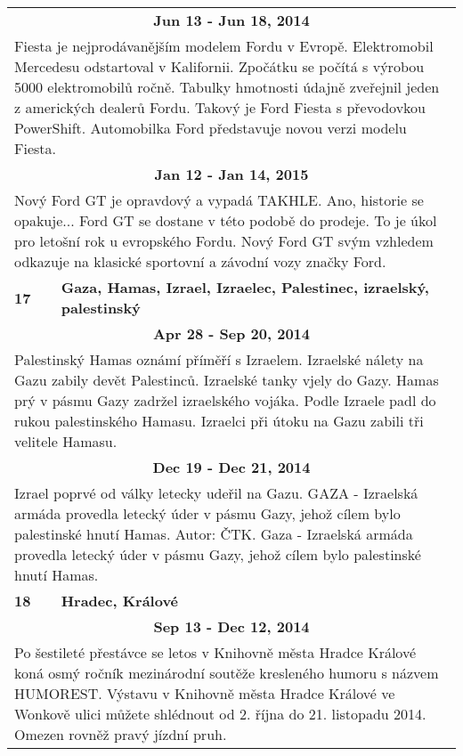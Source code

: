 \begin{tabularx}{\linewidth}{l l}
\multicolumn{2}{c}{\bf Jun 13 - Jun 18, 2014} \\
\multicolumn{2}{p{\linewidth}}{Fiesta je nejprodávanějším modelem Fordu v Evropě. Elektromobil Mercedesu odstartoval v Kalifornii. Zpočátku se počítá s výrobou 5000 elektromobilů ročně. Tabulky hmotnosti údajně zveřejnil jeden z amerických dealerů Fordu. Takový je Ford Fiesta s převodovkou PowerShift. Automobilka Ford představuje novou verzi modelu Fiesta.} \\ \midrule
\multicolumn{2}{c}{\bf Jan 12 - Jan 14, 2015} \\
\multicolumn{2}{p{\linewidth}}{Nový Ford GT je opravdový a vypadá TAKHLE. Ano, historie se opakuje... Ford GT se dostane v této podobě do prodeje. To je úkol pro letošní rok u evropského Fordu. Nový Ford GT svým vzhledem odkazuje na klasické sportovní a závodní vozy značky Ford.} \\ \midrule[1.5pt]

\bf 17 & \bf Gaza, Hamas, Izrael, Izraelec, Palestinec, izraelský, palestinský \\ \midrule
\multicolumn{2}{c}{\bf Apr 28 - Sep 20, 2014} \\
\multicolumn{2}{p{\linewidth}}{Palestinský Hamas oznámí příměří s Izraelem. Izraelské nálety na Gazu zabily devět Palestinců. Izraelské tanky vjely do Gazy. Hamas prý v pásmu Gazy zadržel izraelského vojáka. Podle Izraele padl do rukou palestinského Hamasu. Izraelci při útoku na Gazu zabili tři velitele Hamasu.} \\ \midrule
\multicolumn{2}{c}{\bf Dec 19 - Dec 21, 2014} \\
\multicolumn{2}{p{\linewidth}}{Izrael poprvé od války letecky udeřil na Gazu. GAZA - Izraelská armáda provedla letecký úder v pásmu Gazy, jehož cílem bylo palestinské hnutí Hamas. Autor: ČTK. Gaza - Izraelská armáda provedla letecký úder v pásmu Gazy, jehož cílem bylo palestinské hnutí Hamas.} \\ \midrule[1.5pt]

\bf 18 & \bf Hradec, Králové \\ \midrule
\multicolumn{2}{c}{\bf Sep 13 - Dec 12, 2014} \\
\multicolumn{2}{p{\linewidth}}{Po šestileté přestávce se letos v Knihovně města Hradce Králové koná osmý ročník mezinárodní soutěže kresleného humoru s názvem HUMOREST. Výstavu v Knihovně města Hradce Králové ve Wonkově ulici můžete shlédnout od 2. října do 21. listopadu 2014. Omezen rovněž pravý jízdní pruh.} \\ \midrule[1.5pt]


\end{tabularx}
